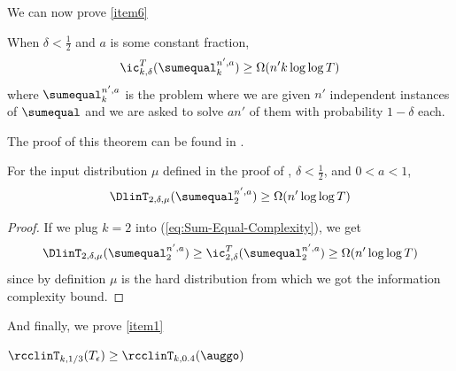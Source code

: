 %
{\color{black} We can now prove \ref{item6}}

\begin{theorem}
When $\delta < \frac{1}{2}$ and $a$ is some constant fraction,
\begin{equation}
    \ic^T_{k,\delta}(\sumequal_k^{n',a}) \ge \Omega(n'k \log \log T)
    \label{eq:Sum-Equal-Complexity}
\end{equation}
where $\sumequal_k^{n',a}$ is the problem where we are given $n'$ independent instances of $\sumequal$ and we are asked to solve $an'$ of them with probability $1-\delta$ each.
\label{thm:woodruff}
\end{theorem}
The proof of this theorem can be found in .

\begin{corollary}
For the input distribution $\mu$ defined in the proof of , $\delta < \frac{1}{2}$, and $0<a<1$,
$$\DlinT_{2,\delta,\mu}(\sumequal_2^{n',a}) \ge \Omega(n' \log \log T)$$
\end{corollary}
\begin{proof}
If we plug $k=2$ into (\ref{eq:Sum-Equal-Complexity}), we get
$$\DlinT_{2,\delta,\mu}(\sumequal_2^{n',a}) \ge \ic^T_{2,\delta}(\sumequal_2^{n',a}) \ge \Omega(n' \log \log T)$$
since by definition $\mu$ is the hard distribution
%
{}from which we got the information complexity bound.  %
\end{proof}

%
{\color{black} And finally, we prove \ref{item1}}

\begin{theorem}
$\rcclinT_{k,1/3}(T_\epsilon) \ge \rcclinT_{k,0.4}(\auggo)$
\end{theorem}

